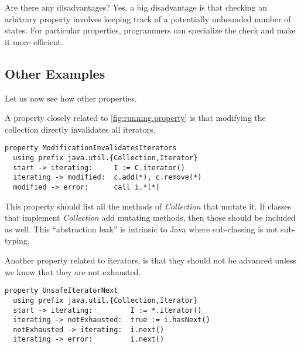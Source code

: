 \documentclass[preprint]{sigplanconf} %
\theoremstyle{definition}
\begin{document}
Are there any disadvantages?
Yes, a big disadvantage is that checking an arbitrary property involves keeping track of a potentially unbounded number of states.
For particular properties, programmers can specialize the check and make it more efficient.

\subsection{Other Examples} \label{sec:example.others} %

Let us now see how other properties.

A property closely related to \autoref{fig:running.property} is that modifying the collection directly invalidates all iterators.
\par\medskip\noindent
\begin{Verbatim}
property ModificationInvalidatesIterators
  using prefix java.util.{Collection,Iterator}
  start -> iterating:     I := C.iterator()
  iterating -> modified:  c.add(*), c.remove(*)
  modified -> error:      call i.*[*]
\end{Verbatim}
\par\medskip\noindent This property should list all the methods of \textit{Collection} that mutate it.
If classes that implement \textit{Collection} add mutating methods, then those should be included as well.
This ``abstraction leak'' is intrinsic to Java where sub-classing is not sub-typing.

Another property related to iterators, is that they should not be advanced unless we know that they are not exhausted.
\par\medskip\noindent
\begin{Verbatim}
property UnsafeIteratorNext
  using prefix java.util.{Collection,Iterator}
  start -> iterating:         I := *.iterator()
  iterating -> notExhausted:  true := i.hasNext()
  notExhausted -> iterating:  i.next()
  iterating -> error:         i.next()
\end{Verbatim}
\par\medskip
\end{document}
